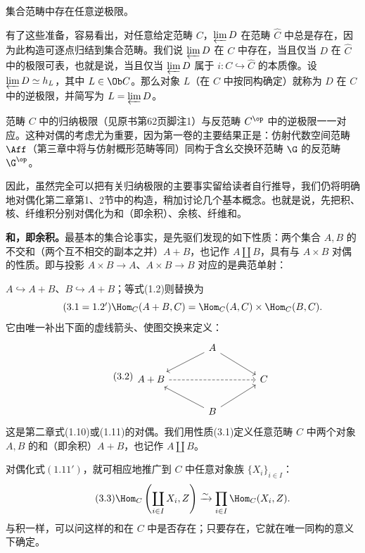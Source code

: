 集合范畴中存在任意逆极限。

有了这些准备，容易看出，对任意给定范畴 $C$，$\varprojlim D$ 在范畴 $\widehat C$ 中总是存在，因为此构造可逐点归结到集合范畴。我们说 $\varprojlim D$ 在 $C$ 中存在，当且仅当 $D$ 在 $\widehat C$ 中的极限可表，也就是说，当且仅当 $\varprojlim D$ 属于 $i:C\hookrightarrow\widehat C$ 的本质像。设 $\varprojlim D\simeq h_L$，其中 $L\in\Ob C$。那么对象 $L$（在 $C$ 中按同构确定）就称为 $D$ 在 $C$ 中的逆极限，并简写为 $L=\varprojlim D$。

范畴 $C$ 中的归纳极限（见原书第62页脚注1）与反范畴 $C^{\op}$ 中的逆极限一一对应。这种对偶的考虑尤为重要，因为第一卷的主要结果正是：仿射代数空间范畴 $\Aff$（第三章中将与仿射概形范畴等同）同构于含幺交换环范畴 $\G$ 的反范畴 $\G^{\op}$。

因此，虽然完全可以把有关归纳极限的主要事实留给读者自行推导，我们仍将明确地对偶化第二章第1、2节中的构造，稍加讨论几个基本概念。也就是说，先把积、核、纤维积分别对偶化为和（即余积）、余核、纤维和。

\textbf{和，即余积。}最基本的集合论事实，是先驱们发现的如下性质：两个集合 $A,B$ 的不交和（两个互不相交的副本之并）$A+B$，也记作 $A\amalg B$，具有与 $A\times B$ 对偶的性质。即与投影 $A\times B\to A$、$A\times B\to B$ 对应的是典范单射：

$A\hookrightarrow A+B$、$B\hookrightarrow A+B$；等式(1.2)则替换为
\begin{equation}\tag{$3.1=1.2'$}
 \Hom_C(A+B,C)=\Hom_C(A,C)\times\Hom_C(B,C).
\end{equation}
它由唯一补出下面的虚线箭头、使图交换来定义：
\begin{equation}\tag{3.2}
\begin{tikzcd}[column sep=large,ampersand replacement=\&]
 \&A\arrow[dl]\arrow[dr]\&\\
 A+B\arrow[rr,dashed]\&\&C\\
 \&B\arrow[ul]\arrow[ur]\&
\end{tikzcd}
\end{equation}
这是第二章式(1.10)或(1.11)的对偶。我们用性质(3.1)定义任意范畴 $C$ 中两个对象 $A,B$ 的和（即余积）$A+B$，也记作 $A\amalg B$。

对偶化式$(1.11')$，就可相应地推广到 $C$ 中任意对象族 $\{X_i\}_{i\in I}$：
\begin{equation}\tag{3.3}
 \Hom_C\left(\coprod_{i\in I}X_i,Z\right)\xrightarrow\sim
 \prod_{i\in I}\Hom_C(X_i,Z).
\end{equation}
与积一样，可以问这样的和在 $C$ 中是否存在；只要存在，它就在唯一同构的意义下确定。

